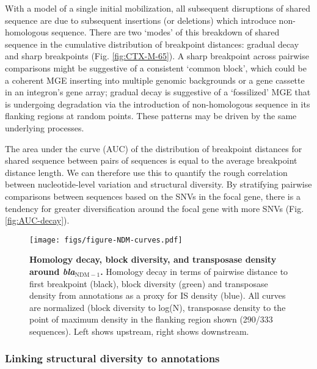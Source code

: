 \documentclass[rmp,superscriptaddress,11pt]{revtex4-1}
\newcommand{\bla}[1]{\textit{bla}$_\mathrm{#1}$}
\begin{document}
With a model of a single initial mobilization, all subsequent disruptions of shared sequence are due to subsequent insertions (or deletions) which introduce non-homologous sequence. There are two `modes' of this breakdown of shared sequence in the cumulative distribution of breakpoint distances: gradual decay and sharp breakpoints (Fig. \ref{fig:CTX-M-65}). A sharp breakpoint across pairwise comparisons might be suggestive of a consistent `common block', which could be a coherent MGE inserting into multiple genomic backgrounds or a gene cassette in an integron's gene array; gradual decay is suggestive of a `fossilized' MGE that is undergoing degradation via the introduction of non-homologous sequence in its flanking regions at random points. These patterns may be driven by the same underlying processes.\par

The area under the curve (AUC) of the distribution of breakpoint distances for shared sequence between pairs of sequences is equal to the average breakpoint distance length. We can therefore use this to quantify the rough correlation between nucleotide-level variation and structural diversity. By stratifying pairwise comparisons between sequences based on the SNVs in the focal gene, there is a tendency for greater diversification around the focal gene with more SNVs (Fig. \ref{fig:AUC-decay}). 

\begin{figure*}
    \centering
    \texttt{[image: figs/figure-NDM-curves.pdf]}
    \caption{\textbf{Homology decay, block diversity, and transposase density around \bla{NDM-1}.} Homology decay in terms of pairwise distance to first breakpoint (black), block diversity (green) and transposase density from annotations as a proxy for IS density (blue). All curves are normalized (block diversity to log(N), transposase density to the point of maximum density in the flanking region shown (290/333 sequences). Left shows upstream, right shows downstream.}
    \label{fig:NDM-1-curves}
\end{figure*}

\subsubsection{Linking structural diversity to annotations}
\end{document}
